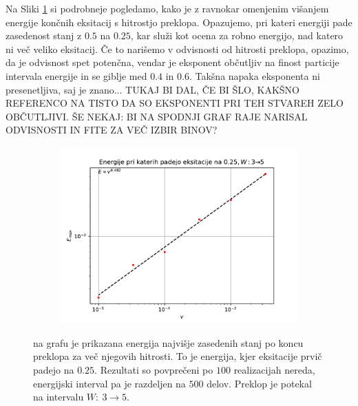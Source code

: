 Na Sliki \ref{fig:Emax} si podrobneje pogledamo, kako je z ravnokar omenjenim višanjem energije končnih eksitacij s hitrostjo preklopa. Opazujemo, pri kateri energiji pade zasedenost stanj z $0.5$ na $0.25$, kar služi kot ocena za robno energijo, nad katero ni več veliko eksitacij. Če to narišemo v odvisnosti od hitrosti preklopa, opazimo, da je odvisnost spet potenčna, vendar je eksponent občutljiv na finost particije intervala energije in se giblje med $0.4$ in $0.6$. Takšna napaka eksponenta ni presenetljiva, saj je znano... TUKAJ BI DAL, ČE BI ŠLO, KAKŠNO REFERENCO NA TISTO DA SO EKSPONENTI PRI TEH STVAREH ZELO OBČUTLJIVI. ŠE NEKAJ: BI NA SPODNJI GRAF RAJE NARISAL ODVISNOSTI IN FITE ZA VEČ IZBIR BINOV? 
\begin{figure}[H]
\centering
\begin{subfigure}{.6\textwidth}
\includegraphics[trim=0 0 0 38,clip,width=\linewidth]{Figures/EmaxP200.pdf}
\end{subfigure}
\caption{na grafu je prikazana energija najvišje zasedenih stanj po koncu preklopa za več njegovih hitrosti. To je energija, kjer eksitacije prvič padejo na $0.25$. Rezultati so povprečeni po $100$ realizacijah nereda, energijski interval pa je razdeljen na $500$ delov. Preklop je potekal na intervalu $W:\ 3 \to 5$.}
\label{fig:Emax}
\end{figure}


